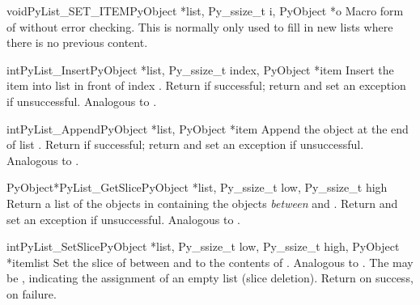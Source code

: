 \begin{cfuncdesc}{void}{PyList_SET_ITEM}{PyObject *list, Py_ssize_t i,
                                              PyObject *o}
  Macro form of  without error checking.
  This is normally only used to fill in new lists where there is no
  previous content.
\end{cfuncdesc}

\begin{cfuncdesc}{int}{PyList_Insert}{PyObject *list, Py_ssize_t index,
                                      PyObject *item}
  Insert the item  into list  in front of index
  .  Return  if successful; return  and
  set an exception if unsuccessful.  Analogous to
  .
\end{cfuncdesc}

\begin{cfuncdesc}{int}{PyList_Append}{PyObject *list, PyObject *item}
  Append the object  at the end of list .
  Return  if successful; return  and set an
  exception if unsuccessful.  Analogous to
  .
\end{cfuncdesc}

\begin{cfuncdesc}{PyObject*}{PyList_GetSlice}{PyObject *list,
                                              Py_ssize_t low, Py_ssize_t high}
  Return a list of the objects in  containing the objects
  \emph{between}  and .  Return \NULL{} and set
  an exception if unsuccessful.
  Analogous to .
\end{cfuncdesc}

\begin{cfuncdesc}{int}{PyList_SetSlice}{PyObject *list,
                                        Py_ssize_t low, Py_ssize_t high,
                                        PyObject *itemlist}
  Set the slice of  between  and  to the
  contents of .  Analogous to
  .
  The  may be \NULL{}, indicating the assignment
  of an empty list (slice deletion).
  Return  on success,  on failure.
\end{cfuncdesc}

